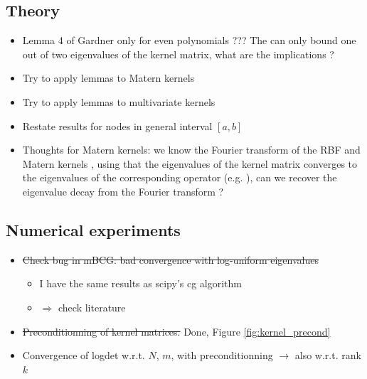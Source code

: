 \documentclass{article}
\begin{document}
\subsection{Theory}

\begin{itemize}
    \item Lemma 4 of Gardner only for even polynomials ??? The  can only bound one out of two eigenvalues of the kernel matrix, what are the implications ?
    \item Try to apply lemmas to Matern kernels
    \item Try to apply lemmas to multivariate kernels
    \item Restate results for nodes in general interval $[a, b]$
    \item Thoughts for Matern kernels: we know the Fourier transform of the RBF and Matern kernels \cite{rasmussen_gaussian_2005}, using that the eigenvalues of the kernel matrix converges to the eigenvalues of the corresponding operator (e.g. \cite{braun_accurate_2006}), can we recover the eigenvalue decay from the Fourier transform ?
\end{itemize}

\subsection{Numerical experiments}

\begin{itemize}
    \item \st{Check bug in mBCG: bad convergence with log-uniform eigenvalues} 
    \begin{itemize}
        \item I have the same results as scipy's cg algorithm
        \item $\Rightarrow$ check literature
    \end{itemize}
    \item \st{Preconditionning of kernel matrices.} Done, Figure \ref{fig:kernel_precond}
    \item Convergence of logdet w.r.t. $N$, $m$, with preconditionning $\rightarrow$ also w.r.t. rank $k$
\end{itemize}
\end{document}
